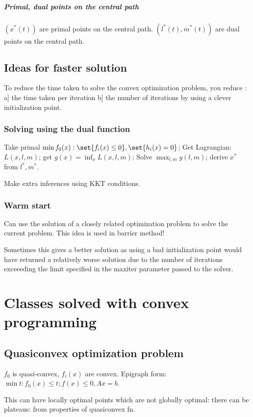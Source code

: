 \documentclass[oneside, article]{memoir}
\begin{document}
\subsubsection{Primal, dual points on the central path}
$(x^{*}(t))$ are primal points on the central path. $(l^{*}(t), m^{*}(t))$ are dual points on the central path. 

\chapter{Ideas for faster solution}
To reduce the time taken to solve the convex optimization problem, you reduce : a] the time taken per iteration b] the number of iterations by using a clever initialization point.

\section{Solving using the dual function}
Take primal $\min f_{0}(x): \set{f_{i}(x) \leq 0}, \set{h_{i}(x) = 0} $; Get Lagrangian: $L(x, l, m)$; get $g(x) = \inf_x L(x, l, m)$; Solve $\max_{l, m} g(l, m)$; derive $x^{*}$ from $l^{*}, m^{*}$.

Make extra inferences using KKT conditions.

\section{Warm start}
Can use the solution of a closely related optimization problem to solve the current problem. This idea is used in barrier method!

Sometimes this gives a better solution as using a bad initialization point would have returned a relatively worse solution due to the number of iterations exceeeding the limit specified in the maxiter parameter passed to the solver.


\part{Classes solved with convex programming}
\chapter{Quasiconvex optimization problem}
$f_0$ is quasi-convex, $f_i(x)$ are convex. Epigraph form: $\min t: f_0(x) \leq t; f(x) \leq 0, Ax = b$.

This can have locally optimal points which are not globally optimal: there can be plateaus: from properties of quasiconvex fn.
\end{document}
